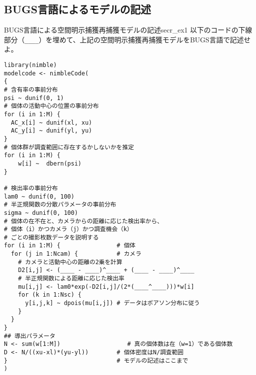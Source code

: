 	\subsection{BUGS言語によるモデルの記述}
\begin{exercise}{BUGS言語による空間明示捕獲再捕獲モデルの記述}{secr_ex1}
以下のコードの下線部分（\verb|____|）を埋めて、上記の空間明示捕獲再捕獲モデルをBUGS言語で記述せよ。
\begin{verbatim}
library(nimble)
modelcode <- nimbleCode(
{
# 含有率の事前分布
psi ~ dunif(0, 1)
# 個体の活動中心の位置の事前分布
for (i in 1:M) {
  AC_x[i] ~ dunif(xl, xu)
  AC_y[i] ~ dunif(yl, yu)
}
# 個体群が調査範囲に存在するかしないかを推定
for (i in 1:M) {
    w[i] ~  dbern(psi)
}

# 検出率の事前分布
lam0 ~ dunif(0, 100)
# 半正規関数の分散パラメータの事前分布
sigma ~ dunif(0, 100)
# 個体の在不在と、カメラからの距離に応じた検出率から、
# 個体（i）かつカメラ（j）かつ調査機会（k）
# ごとの撮影枚数データを説明する
for (i in 1:M) {                # 個体
  for (j in 1:Ncam) {           # カメラ
    # カメラと活動中心の距離の2乗を計算
    D2[i,j] <- (____ - ____)^____ + (____ - ____)^____
    # 半正規関数による距離に応じた検出率
    mu[i,j] <- lam0*exp(-D2[i,j]/(2*(____^____)))*w[i]
    for (k in 1:Nsc) {
      y[i,j,k] ~ dpois(mu[i,j]) # データはポアソン分布に従う
    }
  }
}
## 導出パラメータ
N <- sum(w[1:M])                   # 真の個体数は在（w=1）である個体数
D <- N/((xu-xl)*(yu-yl))        # 個体密度はN/調査範囲
}                               # モデルの記述はここまで
)
\end{verbatim}
\end{exercise}

